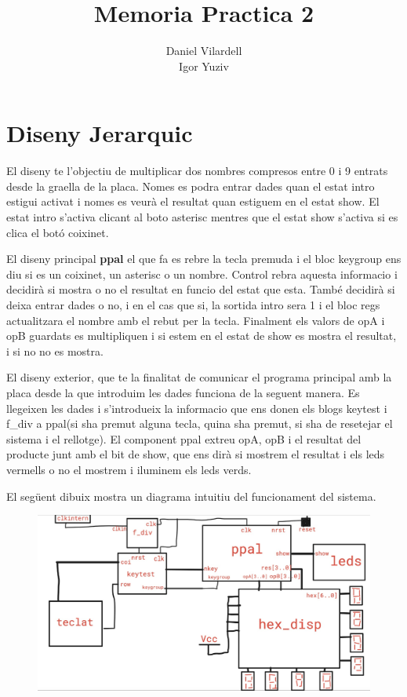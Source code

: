 \documentclass[12pt, a4papre]{article}
\author{Daniel Vilardell\\
	   Igor Yuziv}
\title{\textbf{Memoria Practica 2}}
\date{}
\begin{document}
	\maketitle
	\tableofcontents
     
     \newpage

	\section{Diseny Jerarquic}
	
	El diseny te l'objectiu de multiplicar dos nombres compresos entre 0 i 9 entrats desde la graella de la placa. Nomes es podra entrar dades quan el estat intro estigui activat i nomes es veurà el resultat quan estiguem en el estat show. El estat intro s'activa clicant al boto asterisc mentres que el estat show s'activa si es clica el botó coixinet. 
	
	El diseny principal \textbf{ppal} el que fa es rebre la tecla premuda i el bloc keygroup ens diu si es un coixinet, un asterisc o un nombre. Control rebra aquesta informacio i decidirà si mostra o no el resultat en funcio del estat que esta. També decidirà si deixa entrar dades o no, i en el cas que si, la sortida intro sera 1 i el bloc regs actualitzara el nombre amb el rebut per la tecla. Finalment els valors de opA i opB guardats es multipliquen i si estem en el estat de show es mostra el resultat, i si no no es mostra.
	
	El diseny exterior, que te la finalitat de comunicar el programa principal amb la placa desde la que introduim les dades funciona de la seguent manera. Es llegeixen les dades i s'introdueix la informacio que ens donen els blogs keytest i f\_div a ppal(si sha premut alguna tecla, quina sha premut, si sha de resetejar el sistema i el rellotge). El component ppal extreu opA, opB i el resultat del producte junt amb el bit de show, que ens dirà si mostrem el resultat i els leds vermells o no el mostrem i iluminem els leds verds.
	
	El següent dibuix mostra un diagrama intuitiu del funcionament del sistema.
	
	\begin{figure}[H]
		\begin{center}
		\includegraphics[width=130mm]{Dibuix_diseny.jpeg}
		\end{center}
	\end{figure}
	
\end{document}
